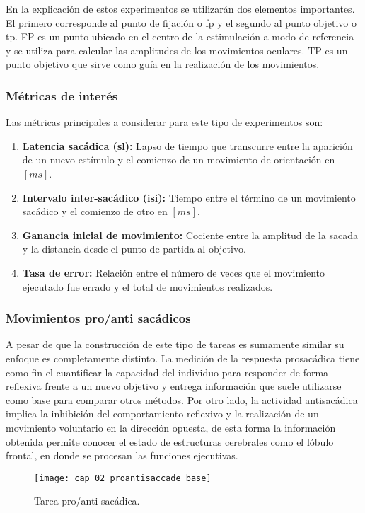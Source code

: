 \documentclass[../main.tex]{subfiles}
\begin{document}
			En la explicación de estos experimentos se utilizarán dos elementos importantes. El primero corresponde al punto de fijación o \acrshort{fp} y el segundo al punto objetivo o \acrshort{tp}. FP es un punto ubicado en el centro de la estimulación a modo de referencia y se utiliza para calcular las amplitudes de los movimientos oculares. TP es un punto objetivo que sirve como guía en la realización de los movimientos. 

			\subsubsection{Métricas de interés}
			\label{ssub:metricas_de_interes}

				Las métricas principales a considerar para este tipo de experimentos son:
				\begin{enumerate}
				 	\item \textbf{Latencia sacádica (\acrshort{sl}):} Lapso de tiempo que transcurre entre la aparición de un nuevo estímulo y el comienzo de un movimiento de orientación en $[ms]$. 

				 	\item \textbf{Intervalo inter-sacádico (\acrshort{isi}):} Tiempo entre el término de un movimiento sacádico y el comienzo de otro en $[ms]$.
				 	
				 	\item \textbf{Ganancia inicial de movimiento:} Cociente entre la amplitud de la sacada y la distancia desde el punto de partida al objetivo. 
				 	
				 	\item \textbf{Tasa de error:} Relación entre el número de veces que el movimiento ejecutado fue errado y el total de movimientos realizados. 

				 \end{enumerate} 

			\subsubsection{Movimientos pro/anti sacádicos}
			\label{ssub:movimientos_pro_anti_sacadicos}

				A pesar de que la construcción de este tipo de tareas es sumamente similar su enfoque es completamente distinto. La medición de la respuesta prosacádica tiene como fin el cuantificar la capacidad del individuo para responder de forma reflexiva frente a un nuevo objetivo y entrega información que suele utilizarse como base para comparar otros métodos. Por otro lado, la actividad antisacádica implica la inhibición del comportamiento reflexivo y la realización de un movimiento voluntario en la dirección opuesta, de esta forma la información obtenida permite conocer el estado de estructuras cerebrales como el lóbulo frontal, en donde se procesan las funciones ejecutivas.
				\begin{figure}[H]
					\centering
					\texttt{[image: cap\_02\_proantisaccade\_base]}
					\caption{Tarea pro/anti sacádica.}
					\label{fig:02_pro_anti_saccade_base}
				\end{figure}  
\end{document}
